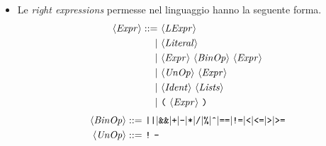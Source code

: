 \begin{itemize}
\item Le \emph{right expressions} permesse nel linguaggio hanno la seguente forma.
\begin{align*}
\langle \mathit{Expr} \rangle ::=\ &\langle \mathit{LExpr} \rangle\\
|\ &\langle \mathit{Literal} \rangle\\
|\ &\langle \mathit{Expr} \rangle\ \langle \mathit{BinOp} \rangle\ \langle \mathit{Expr} \rangle\\
|\ &\langle \mathit{UnOp} \rangle\ \langle \mathit{Expr} \rangle\\
|\ &\langle \mathit{Ident} \rangle\ \langle \mathit{Lists} \rangle\\
|\ &\texttt{(}\ \langle \mathit{Expr} \rangle\ \texttt{)}
\end{align*}
\begin{align*}
\langle \mathit{BinOp} \rangle ::=\ &\texttt{||} | \texttt{\&\&}|\texttt{+}|\texttt{-}|\texttt{*}|\texttt{/}|\texttt{\%}|\texttt{\^{}}|\texttt{==}|\texttt{!=}|\texttt{<}|\texttt{<=}|\texttt{>}|\texttt{>=}\\
\langle \mathit{UnOp} \rangle ::=\ &\texttt{!}\ \texttt{-}
\end{align*}


\end{itemize}

